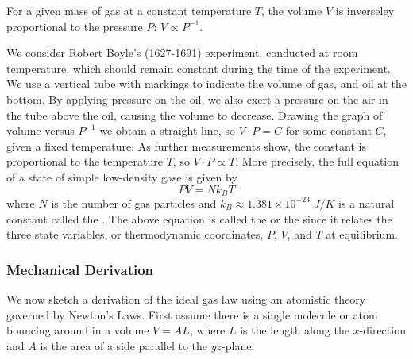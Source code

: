 \documentclass[12pt, a4paper, oneside, openright, titlepage]{book}
\begin{document}
\begin{law}
    For a given mass of gas at a constant temperature $T$, the volume $V$ is inverseley proportional to the pressure $P$: $V \propto P^{-1}$.
\end{law}

We consider Robert Boyle's (1627-1691) experiment, conducted at room temperature, which should remain constant during the time of the experiment. We use a vertical tube with markings to indicate the volume of gas, and oil at the bottom. By applying pressure on the oil, we also exert a pressure on the air in the tube above the oil, causing the volume to decrease. Drawing the graph of volume versus $P^{-1}$ we obtain a straight line, so $V\cdot P = C$ for some constant $C$, given a fixed temperature. As further measurements show, the constant is proportional to the temperature $T$, so $V\cdot P \propto T$. More precisely, the full equation of a state of simple low-density gase is given by \begin{equation}
    \boxed{PV = Nk_BT}
\end{equation}
where $N$ is the number of gas particles and $k_B \approx 1.381\times 10^{-23}\;J/K$ is a natural constant called the . The above equation is called the  or the  since it relates the three state variables, or thermodynamic coordinates, $P$, $V$, and $T$ at equilibrium.

\subsubsection{Mechanical Derivation}

We now sketch a derivation of the ideal gas law using an atomistic theory governed by Newton's Laws. First assume there is a single molecule or atom bouncing around in a volume $V = AL$, where $L$ is the length along the $x$-direction and $A$ is the area of a side parallel to the $yz$-plane:
\end{document}
